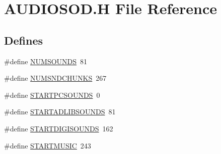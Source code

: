 \hypertarget{AUDIOSOD_8H}{
\section{AUDIOSOD.H File Reference}
\label{AUDIOSOD_8H}
}
\subsection*{Defines}
\begin{DoxyCompactItemize}
\item 
\#define \hyperlink{AUDIOSOD_8H_aa948e91a657468d5faa690ec1a89230b}{NUMSOUNDS}~81
\item 
\#define \hyperlink{AUDIOSOD_8H_adb660029e11963733384781d8bd6dc24}{NUMSNDCHUNKS}~267
\item 
\#define \hyperlink{AUDIOSOD_8H_a1c2885b0208a74942feaa303bb5b1119}{STARTPCSOUNDS}~0
\item 
\#define \hyperlink{AUDIOSOD_8H_a7d40bf6bf62cde9ae5f212e063328200}{STARTADLIBSOUNDS}~81
\item 
\#define \hyperlink{AUDIOSOD_8H_adb5a42984ba81d350a944cc41434a6f7}{STARTDIGISOUNDS}~162
\item 
\#define \hyperlink{AUDIOSOD_8H_acdd20a00d56efe82715df1d7a2facc10}{STARTMUSIC}~243
\end{DoxyCompactItemize}
